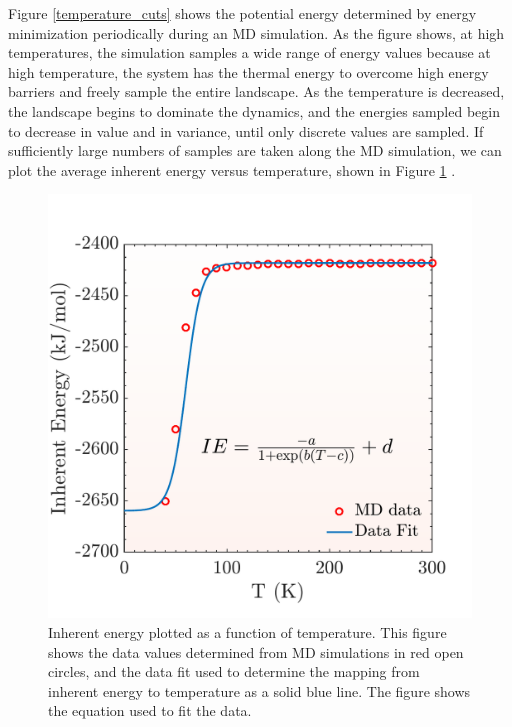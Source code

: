Figure \ref{temperature_cuts} shows the potential energy determined by energy minimization periodically during an MD simulation.  As the figure shows, at high temperatures, the simulation samples a wide range of energy values because at high temperature, the system has the thermal energy to overcome high energy barriers and freely sample the entire landscape.  As the temperature is decreased, the landscape begins to dominate the dynamics, and the energies sampled begin to decrease in value and in variance, until only discrete values are sampled.  If sufficiently large numbers of samples are taken along the MD simulation, we can plot the average inherent energy versus temperature, shown in Figure \ref{sample_mapping} \cite{Kushima2009, Kushima2009a}.

\begin{figure}[h]
	\centering
	\includegraphics[width = .5\textwidth]{./Figures/MTD/example_mapping.pdf}
	\caption{Inherent energy plotted as a function of temperature.  This figure shows the data values determined from MD simulations in red open circles, and the data fit used to determine the mapping from inherent energy to temperature as a solid blue line.  The figure shows the equation used to fit the data. }
	\label{sample_mapping}
\end{figure}

